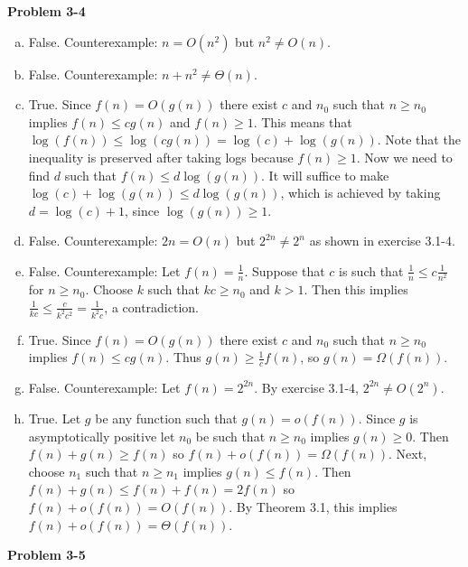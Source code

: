 \documentclass{article}
\begin{document}
\noindent\textbf{Problem 3-4}\\
\begin{enumerate}[a.]
\item False.  Counterexample: $n = O(n^2)$ but $n^2 \neq O(n)$. \\

\item False.  Counterexample: $n + n^2 \neq \Theta(n)$. \\

\item True.  Since $f(n) = O(g(n))$ there exist $c$ and $n_0$ such that $n \geq n_0$ implies $f(n) \leq cg(n)$ and $f(n) \geq 1$.  This means that $\log(f(n)) \leq \log(cg(n)) = \log(c) + \log(g(n))$.  Note that the inequality is preserved after taking logs because $f(n) \geq 1$.  Now we need to find $d$ such that $f(n) \leq d\log(g(n))$.  It will suffice to make $\log(c) + \log(g(n)) \leq d\log(g(n))$, which is achieved by taking $d = \log(c) + 1$, since $\log(g(n)) \geq 1$.\\

\item False.  Counterexample: $2n = O(n)$ but $2^{2n} \neq 2^{n}$ as shown in exercise 3.1-4. \\

\item False.  Counterexample: Let $f(n) = \frac{1}{n}$. Suppose that $c$ is such that $\frac{1}{n} \leq c \frac{1}{n^2}$ for $n \geq n_0$.  Choose $k$ such that $kc \geq n_0$ and $k > 1$.  Then this implies $\frac{1}{kc} \leq \frac{c}{k^2c^2} = \frac{1}{k^2 c}$, a contradiction.  \\

\item True.  Since $f(n) = O(g(n))$ there exist $c$ and $n_0$ such that $n \geq n_0$ implies $f(n) \leq c g(n)$.  Thus $g(n) \geq \frac{1}{c} f(n)$, so $g(n) = \Omega(f(n))$. \\

\item False.  Counterexample: Let $f(n) = 2^{2n}$.  By exercise 3.1-4, $2^{2n} \neq O(2^n)$. \\

\item True.  Let $g$ be any function such that $g(n) = o(f(n))$.  Since $g$ is asymptotically positive let $n_0$ be such that $n \geq n_0$ implies $g(n) \geq 0$.  Then $f(n) + g(n) \geq f(n)$ so $f(n) + o(f(n)) = \Omega(f(n))$.  Next, choose $n_1$ such that $n \geq n_1$ implies $g(n) \leq f(n)$.  Then $f(n) + g(n) \leq f(n) + f(n) = 2f(n)$ so $f(n) + o(f(n)) = O(f(n))$.  By Theorem 3.1, this implies $f(n) + o(f(n)) = \Theta(f(n))$. 
\end{enumerate}
\noindent\textbf{Problem 3-5}\\
\end{document}
